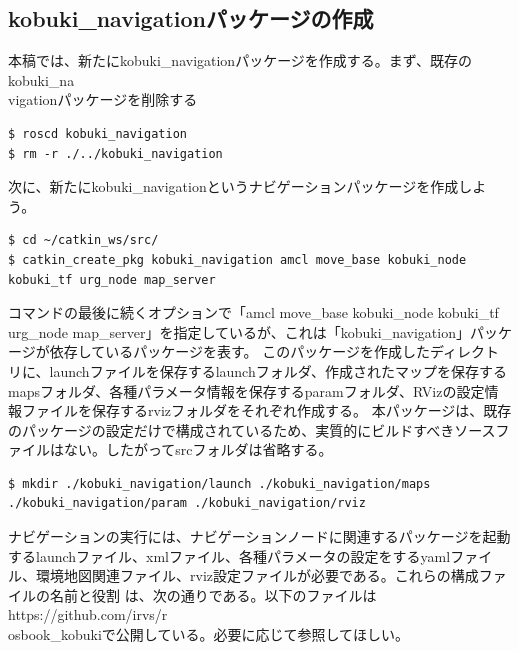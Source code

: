 \subsection{kobuki\_navigationパッケージの作成}

本稿では、新たにkobuki\_navigationパッケージを作成する。まず、既存のkobuki\_na\\vigationパッケージを削除する

\begin{lstlisting}[language=ROS]
$ roscd kobuki_navigation
$ rm -r ./../kobuki_navigation
\end{lstlisting}

次に、新たにkobuki\_navigationというナビゲーションパッケージを作成しよう。

\begin{lstlisting}[language=ROS]
$ cd ~/catkin_ws/src/
$ catkin_create_pkg kobuki_navigation amcl move_base kobuki_node kobuki_tf urg_node map_server
\end{lstlisting}

コマンドの最後に続くオプションで「amcl move\_base kobuki\_node kobuki\_tf urg\_node map\_server」を指定しているが、これは「kobuki\_navigation」パッケージが依存しているパッケージを表す。
このパッケージを作成したディレクトリに、launchファイルを保存するlaunchフォルダ、作成されたマップを保存するmapsフォルダ、各種パラメータ情報を保存するparamフォルダ、RVizの設定情報ファイルを保存するrvizフォルダをそれぞれ作成する。  本パッケージは、既存のパッケージの設定だけで構成されているため、実質的にビルドすべきソースファイルはない。したがってsrcフォルダは省略する。

\begin{lstlisting}[language=ROS]
$ mkdir ./kobuki_navigation/launch ./kobuki_navigation/maps ./kobuki_navigation/param ./kobuki_navigation/rviz
\end{lstlisting}

ナビゲーションの実行には、ナビゲーションノードに関連するパッケージを起動するlaunchファイル、xmlファイル、各種パラメータの設定をするyamlファイル、環境地図関連ファイル、rviz設定ファイルが必要である。これらの構成ファイルの名前と役割 は、次の通りである。以下のファイルはhttps://github.com/irvs/r\\osbook\_kobukiで公開している。必要に応じて参照してほしい。

